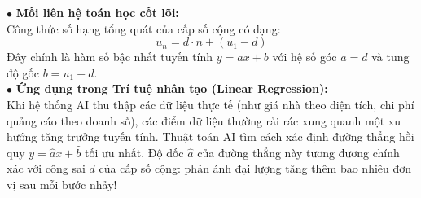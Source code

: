 \documentclass[12pt, a4paper]{article}
\begin{document}
\begin{aibox}
    $\bullet$ \textbf{Mối liên hệ toán học cốt lõi:}\\
    Công thức số hạng tổng quát của cấp số cộng có dạng:
    $$u_n = d \cdot n + (u_1 - d)$$
    Đây chính là hàm số bậc nhất tuyến tính $y = ax + b$ với hệ số góc $a = d$ và tung độ gốc $b = u_1 - d$.\\
    $\bullet$ \textbf{Ứng dụng trong Trí tuệ nhân tạo (Linear Regression):}\\
    Khi hệ thống AI thu thập các dữ liệu thực tế (như giá nhà theo diện tích, chi phí quảng cáo theo doanh số), các điểm dữ liệu thường rải rác xung quanh một xu hướng tăng trưởng tuyến tính. Thuật toán AI tìm cách xác định đường thẳng hồi quy $y = \hat{a}x + \hat{b}$ tối ưu nhất. Độ dốc $\hat{a}$ của đường thẳng này tương đương chính xác với công sai $d$ của cấp số cộng: phản ánh đại lượng tăng thêm bao nhiêu đơn vị sau mỗi bước nhảy!
\end{aibox}
\end{document}
